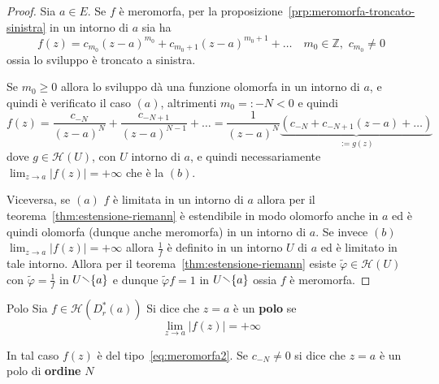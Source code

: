 \begin{proof}
    Sia \(a \in E\). Se \(f\) è meromorfa, per la
    proposizione~\ref{prp:meromorfa-troncato-sinistra} in un intorno di \(a\)
    sia ha \[
    f{(z)} = c_{m_{0}} {(z-a)}^{m_{0}} + c_{m_{0}+1}{(z-a)}^{m_{0}+1} + \dots
    \quad m_{0} \in \mathbb{Z},\,\, c_{m_{0}} \neq 0
\]
    ossia lo sviluppo è troncato a sinistra. 

    Se \(m_{0} \ge 0\) allora lo sviluppo dà una funzione olomorfa in un intorno
    di \(a\), e quindi è verificato il caso \((a)\), altrimenti \(m_{0} =: -N
    <0\) e quindi
\begin{equation}\label{eq:meromorfa2}
    f{(z)} = \frac{c_{-N} }{{(z-a)}^{N}} + \frac{c_{-N + 1} }{{(z-a)}^{N-1}} +
    \dots = \frac{1}{{(z-a)}^{N}}\underbrace{\left( c_{-N} + c_{-N+1} {(z-a)} +
    \dots \right)}_{:= g{(z)}}  
\end{equation}
    dove \(g \in \mathcal{H}{(U)}\), con \(U\) intorno di \(a\), e quindi
    necessariamente \(\lim_{z \to a} |f{(z)}| = +\infty\) che è la \((b)\).
    
    Viceversa, se \({(a)}\) \(f\) è limitata in un intorno di \(a\) allora per il
    teorema~\ref{thm:estensione-riemann} è estendibile in modo olomorfo anche in
    \(a\) ed è quindi olomorfa (dunque anche meromorfa) in un intorno di \(a\).
    Se invece \({(b)}\) \(\lim_{z \to a} |f{(z)}| = +\infty\) allora \(\frac{1}{f}\) è
    definito in un intorno \(U\) di \(a\) ed è limitato in tale intorno. Allora per
    il teorema~\ref{thm:estensione-riemann} esiste \(\tilde{\varphi } \in
    \mathcal{H}{(U)}\) con \(\tilde{\varphi} = \frac{1}{f}\) in \(U \sminus
    \{a\} \) e dunque \(\tilde{\varphi} f = 1\) in \(U \sminus \{a\} \) ossia
    \(f\) è meromorfa.

\end{proof}
\begin{definition}{Polo}\label{def:polo}
    Sia \(f \in \mathcal{H}{(D^*_r{(a)})}\) Si dice che \(z = a\) è un
    \textbf{polo} se 
\[
    \lim_{z \to a} |f{(z)}| = + \infty
\]
\end{definition}
In tal caso \(f{(z)}\) è del tipo~\eqref{eq:meromorfa2}. Se \(c_{-N} \neq 0\) si
dice che \(z=a\) è un polo di \textbf{ordine} \(N\)

